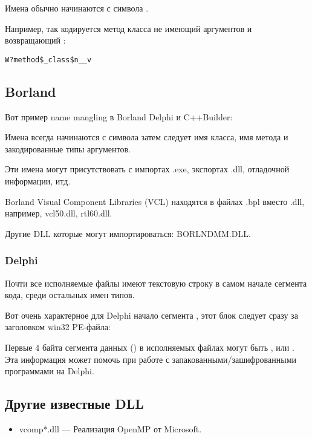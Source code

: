 Имена обычно начинаются с символа .

Например, так кодируется метод  класса  не имеющий аргументов и возвращающий \Tvoid{}:

\begin{lstlisting}
W?method$_class$n__v
\end{lstlisting}

\subsection{Borland}

Вот пример \gls{name mangling} в Borland Delphi и C++Builder:



Имена всегда начинаются с символа  
затем следует имя класса, имя метода
и закодированные типы аргументов.

Эти имена могут присутствовать с импортах .exe, экспортах .dll, отладочной информации, итд.

Borland Visual Component Libraries (VCL) находятся в файлах .bpl вместо .dll, например, vcl50.dll, rtl60.dll.

Другие DLL которые могут импортироваться: BORLNDMM.DLL.

\subsubsection{Delphi}

Почти все исполняемые файлы имеют текстовую строку  
в самом начале сегмента кода, среди остальных имен типов.

Вот очень характерное для Delphi начало сегмента , 
этот блок следует сразу за заголовком win32 PE-файла:



Первые 4 байта сегмента данных () в исполняемых файлах могут быть ,  или .
Эта информация может помочь при работе с запакованными/зашифрованными программами на Delphi.

\subsection{Другие известные DLL}

\begin{itemize}
\item vcomp*.dll --- Реализация OpenMP от Microsoft.
\end{itemize}

